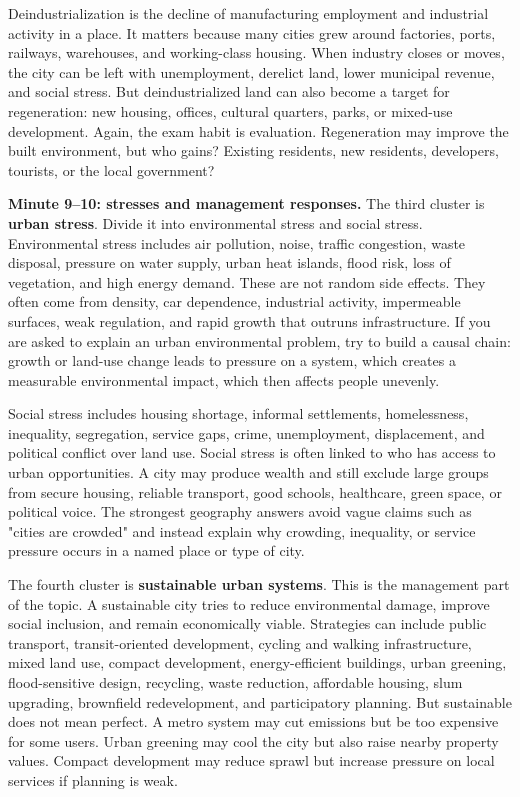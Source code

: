 \documentclass[11pt,a4paper]{article}
\newcommand{\term}[1]{\textcolor{HeadingBlue}{\textbf{#1}}}
\begin{document}
Deindustrialization is the decline of manufacturing employment and industrial
activity in a place. It matters because many cities grew around factories,
ports, railways, warehouses, and working-class housing. When industry closes or
moves, the city can be left with unemployment, derelict land, lower municipal
revenue, and social stress. But deindustrialized land can also become a target
for regeneration: new housing, offices, cultural quarters, parks, or mixed-use
development. Again, the exam habit is evaluation. Regeneration may improve the
built environment, but who gains? Existing residents, new residents, developers,
tourists, or the local government?

\textbf{Minute 9--10: stresses and management responses.}
The third cluster is \term{urban stress}. Divide it into environmental stress
and social stress. Environmental stress includes air pollution, noise, traffic
congestion, waste disposal, pressure on water supply, urban heat islands, flood
risk, loss of vegetation, and high energy demand. These are not random side
effects. They often come from density, car dependence, industrial activity,
impermeable surfaces, weak regulation, and rapid growth that outruns
infrastructure. If you are asked to explain an urban environmental problem, try
to build a causal chain: growth or land-use change leads to pressure on a system,
which creates a measurable environmental impact, which then affects people
unevenly.

Social stress includes housing shortage, informal settlements, homelessness,
inequality, segregation, service gaps, crime, unemployment, displacement, and
political conflict over land use. Social stress is often linked to who has
access to urban opportunities. A city may produce wealth and still exclude large
groups from secure housing, reliable transport, good schools, healthcare, green
space, or political voice. The strongest geography answers avoid vague claims
such as "cities are crowded" and instead explain why crowding, inequality, or
service pressure occurs in a named place or type of city.

The fourth cluster is \term{sustainable urban systems}. This is the management
part of the topic. A sustainable city tries to reduce environmental damage,
improve social inclusion, and remain economically viable. Strategies can include
public transport, transit-oriented development, cycling and walking
infrastructure, mixed land use, compact development, energy-efficient buildings,
urban greening, flood-sensitive design, recycling, waste reduction, affordable
housing, slum upgrading, brownfield redevelopment, and participatory planning.
But sustainable does not mean perfect. A metro system may cut emissions but be
too expensive for some users. Urban greening may cool the city but also raise
nearby property values. Compact development may reduce sprawl but increase
pressure on local services if planning is weak.
\end{document}
